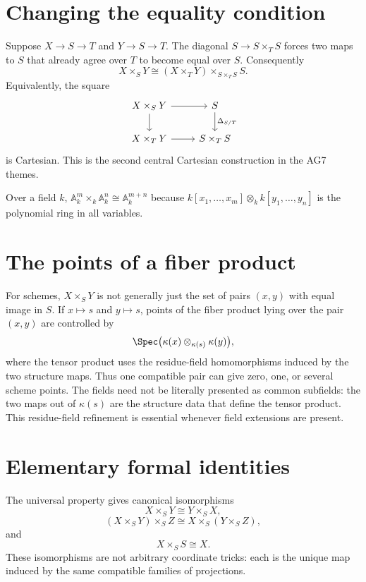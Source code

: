 

\section{Changing the equality condition}
Suppose $X\to S\to T$ and $Y\to S\to T$.  The diagonal $S\to S\times_TS$ forces two maps to
$S$ that already agree over $T$ to become equal over $S$.  Consequently
\[
X\times_SY\cong(X\times_TY)\times_{S\times_TS}S.
\]
Equivalently, the square
\[
\begin{tikzcd}
X\times_SY \arrow[r] \arrow[d] & S \arrow[d,"\Delta_{S/T}"]\\
X\times_TY \arrow[r] & S\times_TS
\end{tikzcd}
\]
is Cartesian.  This is the second central Cartesian construction in the AG7 themes.



\begin{example}\label{ex:vi23-expand-03}
Over a field $k$, $\mathbb A^m_k\times_k\mathbb A^n_k\cong\mathbb A^{m+n}_k$ because $k[x_1,\ldots,x_m]\otimes_k k[y_1,\ldots,y_n]$ is the polynomial ring in all variables.
\end{example}
\section{The points of a fiber product}
For schemes, $X\times_SY$ is not generally just the set of pairs $(x,y)$ with equal image in $S$.
If $x\mapsto s$ and $y\mapsto s$, points of the fiber product lying over the pair $(x,y)$ are
controlled by
\[
\Spec\bigl(\kappa(x)\otimes_{\kappa(s)}\kappa(y)\bigr),
\]
where the tensor product uses the residue-field homomorphisms induced by the two structure maps.
Thus one compatible pair can give zero, one, or several scheme points.  The fields need not be
literally presented as common subfields: the two maps out of $\kappa(s)$ are the structure data
that define the tensor product.  This residue-field refinement is essential whenever field
extensions are present.



\section{Elementary formal identities}
The universal property gives canonical isomorphisms
\[
X\times_SY\cong Y\times_SX,
\]
\[
(X\times_SY)\times_SZ\cong X\times_S(Y\times_SZ),
\]
and
\[
X\times_SS\cong X.
\]
These isomorphisms are not arbitrary coordinate tricks: each is the unique map induced by the same
compatible families of projections.

